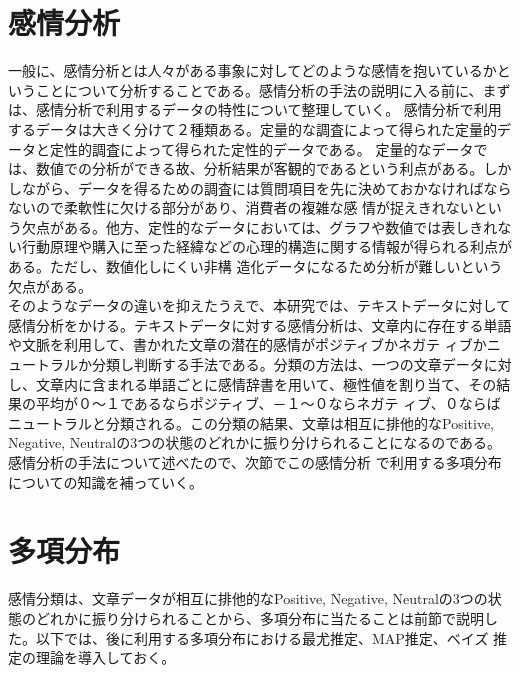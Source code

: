 \documentclass[uplatex,11pt]{jsarticle}
\begin{document}
\section{感情分析}
一般に、感情分析とは人々がある事象に対してどのような感情を抱いているかということについて分析することである。感情分析の手法の説明に入る前に、まずは、感情分析で利用するデータの特性について整理していく。
感情分析で利用するデータは大きく分けて２種類ある。定量的な調査によって得られた定量的データと定性的調査によって得られた定性的データである。
定量的なデータでは、数値での分析ができる故、分析結果が客観的であるという利点がある。しかしながら、データを得るための調査には質問項目を先に決めておかなければならないので柔軟性に欠ける部分があり、消費者の複雑な感
情が捉えきれないという欠点がある。他方、定性的なデータにおいては、グラフや数値では表しきれない行動原理や購入に至った経緯などの心理的構造に関する情報が得られる利点がある。ただし、数値化しにくい非構
造化データになるため分析が難しいという欠点がある。\\
そのようなデータの違いを抑えたうえで、本研究では、テキストデータに対して感情分析をかける。テキストデータに対する感情分析は、文章内に存在する単語や文脈を利用して、書かれた文章の潜在的感情がポジティブかネガテ
ィブかニュートラルか分類し判断する手法である。分類の方法は、一つの文章データに対し、文章内に含まれる単語ごとに感情辞書を用いて、極性値を割り当て、その結果の平均が０～１であるならポジティブ、－１～０ならネガテ
ィブ、０ならばニュートラルと分類される。この分類の結果、文章は相互に排他的なPositive, Negative, Neutralの3つの状態のどれかに振り分けられることになるのである。感情分析の手法について述べたので、次節でこの感情分析
で利用する多項分布についての知識を補っていく。

\section{多項分布}
感情分類は、文章データが相互に排他的なPositive, Negative, Neutralの3つの状態のどれかに振り分けられることから、多項分布に当たることは前節で説明した。以下では、後に利用する多項分布における最尤推定、MAP推定、ベイズ
推定の理論を導入しておく。\\
\end{document}
